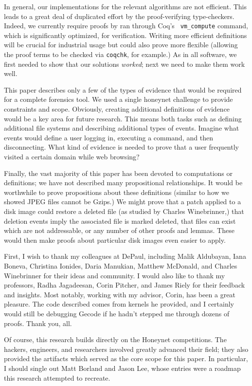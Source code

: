 \documentclass[nocopyrightspace,preprint]{sigplanconf}
\begin{document}
In general, our implementations for the relevant algorithms are not efficient.
This leads to a great deal of duplicated effort by the proof-verifying
type-checkers. Indeed, we currently require proofs by ran through Coq's {\tt
vm\_compute} command, which is significantly optimized, for verification.
Writing more efficient definitions will be crucial for industrial usage but
could also prove more flexible (allowing the proof terms to be checked via
{\tt coqchk}, for example.) As in all software, we first needed to show that
our solutions {\em worked}; next we need to make them work well.

This paper describes only a few of the types of evidence that would be
required for a complete forensics tool. We used a single honeynet challenge to
provide constraints and scope. Obviously, creating additional definitions of
evidence would be a key area for future research. This means both tasks such
as defining additional file systems and describing additional types of events.
Imagine what events would define a user logging in, executing a command, and
then disconnecting. What kind of evidence is needed to prove that a user
frequently visited a certain domain while web browsing?

Finally, the vast majority of this paper has been devoted to computations or
definitions; we have not described many propositional relationships. It would
be worthwhile to prove propositions about these definitions (similar to how we
showed JPEG files cannot be Gzips.) We might prove that a patch applied to a
disk image could restore a deleted file (as studied by Charles Winebrinner,)
that deletion events imply the associated file is marked deleted, that files
can exist which are not addressable, or any number of other proofs and lemmas.
These would then make proofs about particular disk images even easier to
apply. 

\acks
First, I wish to thank my colleagues at DePaul, including Malik Aldubayan,
Iana Boneva, Christina Ionides, Daria Manukian, Matthew McDonald, and Charles
Winebrinner for their ideas and community. I would also like to thank my
professors, Radha Jagadeesan, Corin Pitcher, and James Riely for their
feedback and insights. Most notably, working with my advisor, Corin, has been
a great pleasure. The code described comes from kernels he provided, and I
certainly would still be debugging Gecode if he hadn't stepped me through
dozens of proofs. Thank you, all.

Of course, this research builds directly on the Honeynet competitions. The
hackers, engineers, and researchers involved greatly advanced their field;
they also provided the artifacts which served as the core scope for this
paper. In particular, I should single out Matt Borland and Jason Lee, whose
entries were a roadmap this research attempted to recreate.
\end{document}
